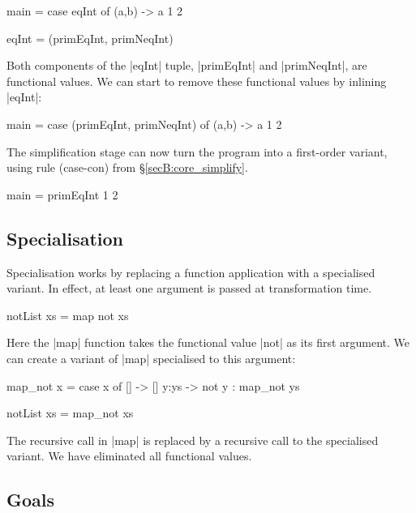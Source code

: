 \begin{example}
\begin{code}
main = case  eqInt of
             (a,b) -> a 1 2

eqInt = (primEqInt, primNeqInt)
\end{code}

Both components of the |eqInt| tuple, |primEqInt| and |primNeqInt|, are functional values. We can start to remove these functional values by inlining |eqInt|:

\begin{code}
main = case  (primEqInt, primNeqInt) of
             (a,b) -> a 1 2
\end{code}

\noindent The simplification stage can now turn the program into a first-order variant, using rule (case-con) from \S\ref{secB:core_simplify}.

\begin{code}
main = primEqInt 1 2
\end{code}
\end{example}

\subsection{Specialisation}

Specialisation works by replacing a function application with a specialised variant. In effect, at least one argument is passed at transformation time.

\begin{example}
\begin{code}
notList xs = map not xs
\end{code}

\noindent Here the |map| function takes the functional value |not| as its first argument. We can create a variant of |map| specialised to this argument:

\begin{code}
map_not x = case  x of
                  []    -> []
                  y:ys  -> not y : map_not ys

notList xs = map_not xs
\end{code}

\noindent The recursive call in |map| is replaced by a recursive call to the specialised variant. We have eliminated all functional values.
\end{example}

\subsection{Goals}
\label{secF:goals}

